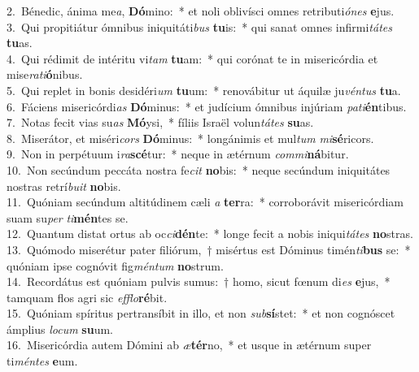 {2.~}Bénedic, ánima me\textit{a}, \textbf{Dó}mino:~* et noli oblivísci omnes retributi\textit{ó}\textit{nes} \textbf{e}jus.\\
{3.~}Qui propitiátur ómnibus iniquitáti\textit{bus} \textbf{tu}is:~* qui sanat omnes infirmi\textit{tá}\textit{tes} \textbf{tu}as.\\
{4.~}Qui rédimit de intéritu vi\textit{tam} \textbf{tu}am:~* qui corónat te in misericórdia et mise\textit{ra}\textit{ti}\textbf{ó}nibus.\\
{5.~}Qui replet in bonis desidéri\textit{um} \textbf{tu}um:~* renovábitur ut áquilæ ju\textit{vén}\textit{tus} \textbf{tu}a.\\
{6.~}Fáciens misericórdi\textit{as} \textbf{Dó}minus:~* et judícium ómnibus injúriam \textit{pa}\textit{ti}\textbf{én}tibus.\\
{7.~}Notas fecit vias su\textit{as} \textbf{Mó}ysi,~* fíliis Israël volun\textit{tá}\textit{tes} \textbf{su}as.\\
{8.~}Miserátor, et miséri\textit{cors} \textbf{Dó}minus:~* longánimis et mul\textit{tum} \textit{mi}\textbf{sé}ricors.\\
{9.~}Non in perpétuum i\textit{ra}\textbf{scé}tur:~* neque in ætérnum \textit{com}\textit{mi}\textbf{ná}bitur.\\
{10.~}Non secúndum peccáta nostra fe\textit{cit} \textbf{no}bis:~* neque secúndum iniquitátes nostras retrí\textit{bu}\textit{it} \textbf{no}bis.\\
{11.~}Quóniam secúndum altitúdinem cæli \textit{a} \textbf{ter}ra:~* corroborávit misericórdiam suam su\textit{per} \textit{ti}\textbf{mén}tes se.\\
{12.~}Quantum distat ortus ab oc\textit{ci}\textbf{dén}te:~* longe fecit a nobis iniqui\textit{tá}\textit{tes} \textbf{no}stras.\\
{13.~}Quómodo miserétur pater filiórum,~† misértus est Dóminus timén\textit{ti}\textbf{bus} se:~* quóniam ipse cognóvit fig\textit{mén}\textit{tum} \textbf{no}strum.\\
{14.~}Recordátus est quóniam pulvis sumus:~† homo, sicut fœnum di\textit{es} \textbf{e}jus,~* tamquam flos agri sic \textit{ef}\textit{flo}\textbf{ré}bit.\\
{15.~}Quóniam spíritus pertransíbit in illo, et non \textit{sub}\textbf{sí}stet:~* et non cognóscet ámplius \textit{lo}\textit{cum} \textbf{su}um.\\
{16.~}Misericórdia autem Dómini ab \textit{æ}\textbf{tér}no,~* et usque in ætérnum super ti\textit{mén}\textit{tes} \textbf{e}um.\\
